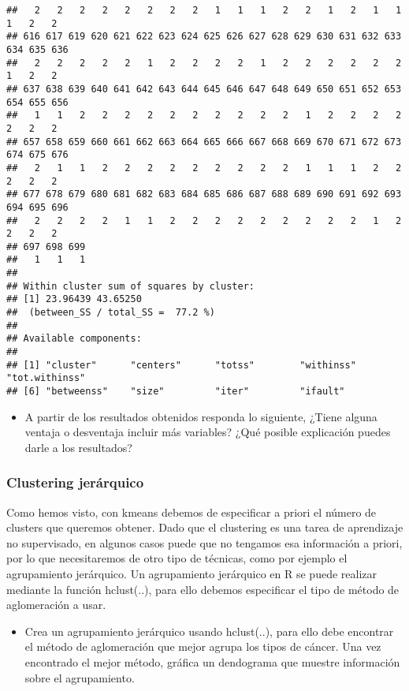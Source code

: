 \documentclass[]{article}
\providecommand{\tightlist}{%
  \setlength{\itemsep}{0pt}\setlength{\parskip}{0pt}}
\begin{document}
\begin{verbatim}
##   2   2   2   2   2   2   2   2   1   1   1   2   2   1   2   1   1   1   2   2 
## 616 617 619 620 621 622 623 624 625 626 627 628 629 630 631 632 633 634 635 636 
##   2   2   2   2   2   1   2   2   2   2   1   2   2   2   2   2   2   1   2   2 
## 637 638 639 640 641 642 643 644 645 646 647 648 649 650 651 652 653 654 655 656 
##   1   1   2   2   2   2   2   2   2   2   2   2   1   2   2   2   2   2   2   2 
## 657 658 659 660 661 662 663 664 665 666 667 668 669 670 671 672 673 674 675 676 
##   2   1   1   2   2   2   2   2   2   2   2   2   1   1   1   2   2   2   2   2 
## 677 678 679 680 681 682 683 684 685 686 687 688 689 690 691 692 693 694 695 696 
##   2   2   2   2   1   1   2   2   2   2   2   2   2   2   2   1   2   2   2   2 
## 697 698 699 
##   1   1   1 
## 
## Within cluster sum of squares by cluster:
## [1] 23.96439 43.65250
##  (between_SS / total_SS =  77.2 %)
## 
## Available components:
## 
## [1] "cluster"      "centers"      "totss"        "withinss"     "tot.withinss"
## [6] "betweenss"    "size"         "iter"         "ifault"
\end{verbatim}

\begin{itemize}
\tightlist
\item
  A partir de los resultados obtenidos responda lo siguiente, ¿Tiene
  alguna ventaja o desventaja incluir más variables? ¿Qué posible
  explicación puedes darle a los resultados?
\end{itemize}

\hypertarget{clustering-jeruxe1rquico}{%
\subsubsection{Clustering jerárquico}\label{clustering-jeruxe1rquico}}

Como hemos visto, con kmeans debemos de especificar a priori el número
de clusters que queremos obtener. Dado que el clustering es una tarea de
aprendizaje no supervisado, en algunos casos puede que no tengamos esa
información a priori, por lo que necesitaremos de otro tipo de técnicas,
como por ejemplo el agrupamiento jerárquico. Un agrupamiento jerárquico
en R se puede realizar mediante la función hclust(..), para ello debemos
especificar el tipo de método de aglomeración a usar.

\begin{itemize}
\tightlist
\item
  Crea un agrupamiento jerárquico usando hclust(..), para ello debe
  encontrar el método de aglomeración que mejor agrupa los tipos de
  cáncer. Una vez encontrado el mejor método, gráfica un dendograma que
  muestre información sobre el agrupamiento.
\end{itemize}
\end{document}

